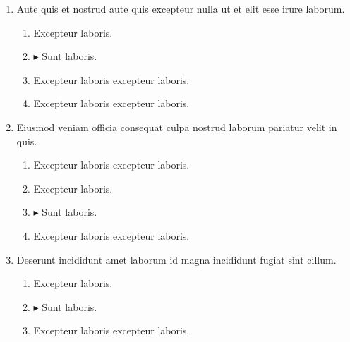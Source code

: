 \documentclass[a4paper,12pt]{article}
\begin{document}
\begin{enumerate}[label=\textbf{\arabic*.}]
\begin{multicols}{2}
\begin{enumerate}
		\item  Aute officia enim dolor aliqua consectetur proident.
    
	\end{enumerate}

\end{multicols}
\item Aute quis et nostrud aute quis excepteur nulla ut et elit esse irure laborum.
\begin{multicols}{2}
	\begin{enumerate}
		\item  Excepteur laboris.
    
		\item $\blacktriangleright$  Sunt laboris.
    
		\item  Excepteur laboris excepteur laboris.
  
		\item  Excepteur laboris excepteur laboris.
    
	\end{enumerate}

\end{multicols}
\item Eiusmod veniam officia consequat culpa nostrud laborum pariatur velit in quis.
\begin{multicols}{2}
	\begin{enumerate}
		\item  Excepteur laboris excepteur laboris.
    
		\item  Excepteur laboris.
    
		\item $\blacktriangleright$  Sunt laboris.
    
		\item  Excepteur laboris excepteur laboris.
  
	\end{enumerate}

\end{multicols}
\item Deserunt incididunt amet laborum id magna incididunt fugiat sint cillum.
\begin{multicols}{2}
	\begin{enumerate}
		\item  Excepteur laboris.
    
		\item $\blacktriangleright$  Sunt laboris.
    
		\item  Excepteur laboris excepteur laboris.
    

\end{enumerate}
\end{multicols}
\end{enumerate}
\end{document}

